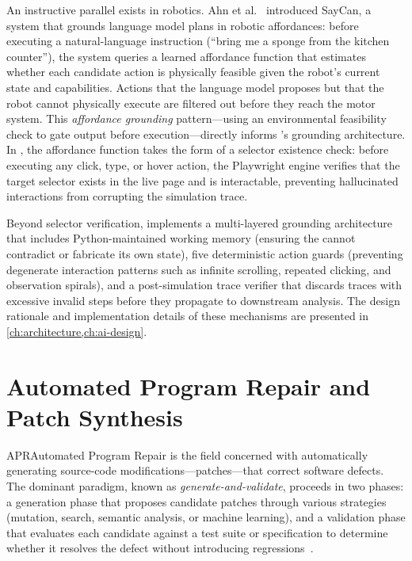 An instructive parallel exists in robotics. Ahn et al.~\cite{saycan} introduced SayCan, a system that grounds language model plans in robotic affordances: before executing a natural-language instruction (``bring me a sponge from the kitchen counter''), the system queries a learned affordance function that estimates whether each candidate action is physically feasible given the robot's current state and capabilities. Actions that the language model proposes but that the robot cannot physically execute are filtered out before they reach the motor system. This \textit{affordance grounding} pattern---using an environmental feasibility check to gate  output before execution---directly informs \versimux{}'s grounding architecture. In \versimux{}, the affordance function takes the form of a  selector existence check: before executing any click, type, or hover action, the Playwright engine verifies that the target selector exists in the live page and is interactable, preventing hallucinated interactions from corrupting the simulation trace.

Beyond selector verification, \versimux{} implements a multi-layered grounding architecture that includes Python-maintained working memory (ensuring the  cannot contradict or fabricate its own state), five deterministic action guards (preventing degenerate interaction patterns such as infinite scrolling, repeated clicking, and observation spirals), and a post-simulation trace verifier that discards traces with excessive invalid steps before they propagate to downstream analysis. The design rationale and implementation details of these mechanisms are presented in \cref{ch:architecture,ch:ai-design}.


\section{Automated Program Repair and Patch Synthesis}
\label{sec:bg-apr}

\acrfull{APR}{Automated Program Repair} is the field concerned with automatically generating source-code modifications---patches---that correct software defects. The dominant paradigm, known as \textit{generate-and-validate}, proceeds in two phases: a generation phase that proposes candidate patches through various strategies (mutation, search, semantic analysis, or machine learning), and a validation phase that evaluates each candidate against a test suite or specification to determine whether it resolves the defect without introducing regressions~\cite{legoues2012genprog}.

